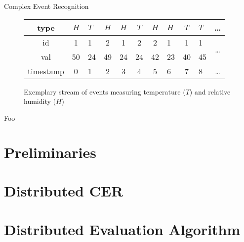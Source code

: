 \documentclass[xcolor=pdftex,dvipsnames,table]{beamer}
\begin{document}
\begin{frame}{Complex Event Recognition}
 \begin{block}{}
    \begin{figure}[H]
      \centering
      \begin{tabular}{|c|c|a|c|c|c|c|a|c|a|c}\hline
        type  &$H$&$T$&$H$&$H$&$T$&$H$&$H$&$T$&$T$ & \ldots \\ \hline
        id  & 1 & 1 & 2 & 1 & 2 & 2 & 1 & 1 & 1 &  \\
        val & 50 & 24& 49& 24& 24& 42& 23& 40& 45\\ \hline
        timestamp & 0 & 1 & 2 & 3 & 4 & 5 & 6 & 7 & 8 & \ldots \\ \hline
      \end{tabular}
      \caption{Exemplary stream of events measuring temperature ($T$) and relative humidity ($H$)}
      \label{fig:stream}
    \end{figure}
 \end{block}
\end{frame}









\begin{frame}{Foo}
  \begin{block}{}

  \end{block}
\end{frame}

\section{Preliminaries}

\section{Distributed CER}

\section{Distributed Evaluation Algorithm}
\end{document}
